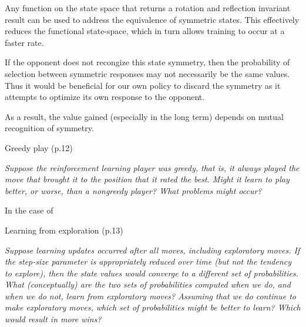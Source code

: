 \documentclass[12pt,letterpaper]{exam}
\newcommand\chapter{1}
\begin{document}
\begin{questions}
	\begin{solution}
		Any function on the state space that returns a rotation and reflection invariant result
		can be used to address the equivalence of symmetric states.
		This effectively reduces the functional state-space, which in turn allows training to occur at a faster rate.

		If the opponent does not recongize this state symmetry, then the probability of selection between
		symmetric responses may not necessarily be the same values. Thus it would be beneficial for our own policy
		to discard the symmetry as it attempts to optimize its own response to the opponent.

		As a result, the value gained (especially in the long term) depends on mutual recognition of symmetry.
	\end{solution}

	\question%
	Greedy play (p.12)
	
	\emph{Suppose the reinforcement learning player was greedy, that is, 
	it always played the move that brought it to the position that it rated the best. 
	Might it learn to play better, or worse, than a nongreedy player? What problems might occur?}

	\begin{solution}
		
		In the case of 
	\end{solution}
	
	\question%
	Learning from exploration (p.13)
	
	\emph{Suppose learning updates occurred after all moves, including exploratory moves. 
	If the step-size parameter is appropriately reduced over time (but not the tendency to explore), 
	then the state values would converge to a different set of probabilities. 
	What (conceptually) are the two sets of probabilities computed when we do, and when we do not, learn from exploratory moves? 
	Assuming that we do continue to make exploratory moves, which set of probabilities might be better to learn? Which would result in more wins?}

	\begin{solution}
	
	\end{solution}
	

	\renewcommand\chapter{2}



\end{questions}
\end{document}

